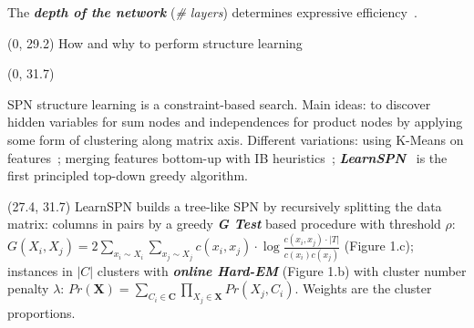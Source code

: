 \documentclass[final]{beamer}
\begin{document}
\begin{frame}{}
\begin{textblock}{25.2}
  The \emph{\textbf{depth of the network}} (\emph{\# layers})
  determines expressive efficiency~\parencite{Martens2014,Zhao2015}.

  \end{textblock}
  
  \begin{textblock}{80}(0, 29.2)
    How and why to perform structure learning
    
  \end{textblock}
  
  \begin{textblock}{25.2}(0, 31.7)
    \footnotesize
     
    SPN structure learning is a constraint-based
    search. Main ideas: to discover hidden variables for sum nodes and independences
    for product nodes by applying some form of clustering
    along matrix axis. Different variations:
    using K-Means on
    features~\emph{\parencite{Dennis2012}}; merging features bottom-up
    with IB heuristics\emph{~\parencite{Peharz2013}};
    \emph{\textbf{LearnSPN}}~\emph{\parencite{Gens2013}} is the first principled top-down greedy
    algorithm. 
    

      

      
  \end{textblock}
  
  \begin{textblock}{25.2}(27.4, 31.7)
    \footnotesize
    LearnSPN builds a tree-like SPN by recursively splitting the data
    matrix: columns in pairs by a greedy \textbf{\emph{G Test}} based
    procedure with threshold $\rho$: $G(X_i, X_j) =  2\sum_{x_i \sim
      X_i}\sum_{x_j \sim X_j}c(x_i, x_j)\cdot \log\frac{c(x_i,
      x_j)\cdot |T|}{c(x_i)c(x_j)}$ (Figure 1.c); instances in
    $|C|$ clusters with \textbf{\emph{online Hard-EM}} (Figure 1.b) with cluster number penalty
    $\lambda$: $Pr(\mathbf{X})= \sum_{C_i \in \mathbf{C}}\prod_{X_j
      \in \mathbf{X}}Pr(X_j,C_i)$. Weights are the cluster proportions.


\end{textblock}
\end{frame}
\end{document}
